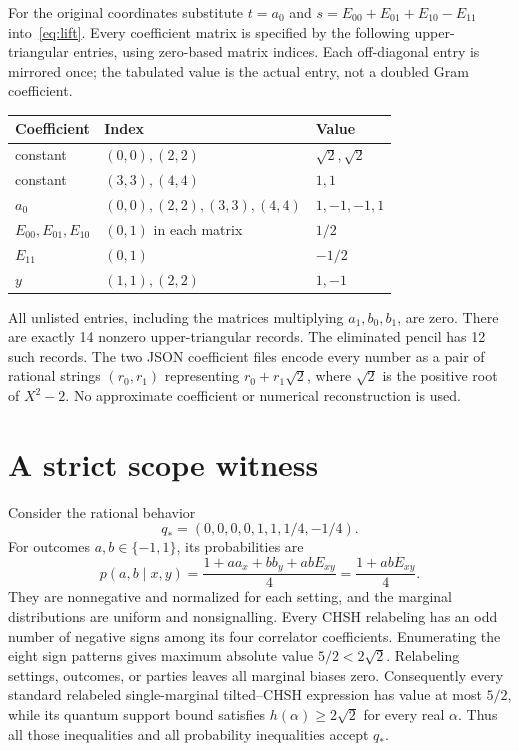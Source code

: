 \documentclass[11pt]{article}
\begin{document}
For the original coordinates substitute $t=a_0$ and $s=E_{00}+E_{01}+E_{10}-E_{11}$ into~\eqref{eq:lift}. Every coefficient matrix is specified by the following upper-triangular entries, using zero-based matrix indices. Each off-diagonal entry is mirrored once; the tabulated value is the actual entry, not a doubled Gram coefficient.
\begin{center}
\begin{tabular}{lll}
\toprule
Coefficient&Index&Value\\\midrule
constant&$(0,0),(2,2)$&$\sqrt2,\sqrt2$\\
constant&$(3,3),(4,4)$&$1,1$\\
$a_0$&$(0,0),(2,2),(3,3),(4,4)$&$1,-1,-1,1$\\
$E_{00},E_{01},E_{10}$&$(0,1)$ in each matrix&$1/2$\\
$E_{11}$&$(0,1)$&$-1/2$\\
$y$&$(1,1),(2,2)$&$1,-1$\\\bottomrule
\end{tabular}
\end{center}
All unlisted entries, including the matrices multiplying $a_1,b_0,b_1$, are zero. There are exactly 14 nonzero upper-triangular records. The eliminated pencil has 12 such records. The two JSON coefficient files encode every number as a pair of rational strings $(r_0,r_1)$ representing $r_0+r_1\sqrt2$, where $\sqrt2$ is the positive root of $X^2-2$. No approximate coefficient or numerical reconstruction is used.

\section{A strict scope witness}
Consider the rational behavior
\begin{equation}\label{eq:scope}
 q_*=(0,0,0,0,1,1,1/4,-1/4).
\end{equation}
For outcomes $a,b\in\{-1,1\}$, its probabilities are
\[
 p(a,b\mid x,y)=\frac{1+a a_x+b b_y+abE_{xy}}4
               =\frac{1+abE_{xy}}4.
\]
They are nonnegative and normalized for each setting, and the marginal distributions are uniform and nonsignalling. Every CHSH relabeling has an odd number of negative signs among its four correlator coefficients. Enumerating the eight sign patterns gives maximum absolute value $5/2<2\sqrt2$. Relabeling settings, outcomes, or parties leaves all marginal biases zero. Consequently every standard relabeled single-marginal tilted--CHSH expression has value at most $5/2$, while its quantum support bound satisfies $h(\alpha)\ge2\sqrt2$ for every real $\alpha$. Thus all those inequalities and all probability inequalities accept $q_*$.
\end{document}

